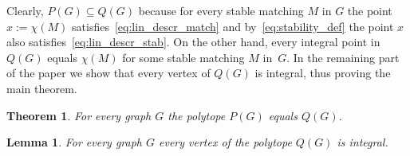 \documentclass[3p,times]{elsarticle}
\newtheorem{lemma}[fact]{Lemma}
\newtheorem{theorem}[fact]{Theorem}
\begin{document}
Clearly, $P(G)\subseteq Q(G)$ because for every stable matching $M$ in
$G$ the point $x:=\chi(M)$ satisfies~\eqref{eq:lin_descr_match} and
by~\eqref{eq:stability_def} the point $x$ also
satisfies~\eqref{eq:lin_descr_stab}. On the other hand, every integral
point in $Q(G)$ equals $\chi(M)$ for some stable matching $M$
in~$G$. In the remaining part of the paper we show that every vertex
of $Q(G)$ is integral, thus proving the main theorem.

\begin{theorem}
	For every graph $G$ the polytope $P(G)$ equals $Q(G)$.
\end{theorem}


\begin{lemma}
	For every graph $G$ every vertex of the polytope $Q(G)$ is integral.
\end{lemma}
\end{document}
